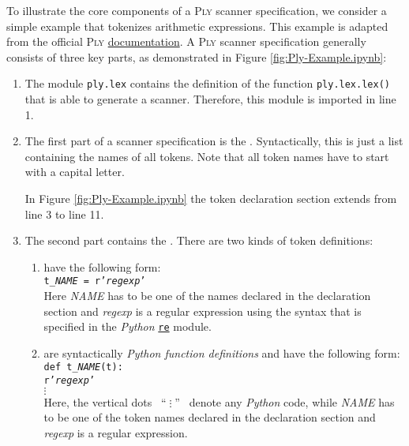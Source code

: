 To illustrate the core components of a \textsc{Ply} scanner specification, we consider a simple example that
tokenizes arithmetic expressions. This example is adapted from the official \textsc{Ply}
\href{https://ply.readthedocs.io/en/latest/ply.html#specification-of-tokens}{documentation}. A \textsc{Ply}
scanner specification generally consists of three key parts, as demonstrated in Figure
\ref{fig:Ply-Example.ipynb}: 
\begin{enumerate}
\item The module \texttt{ply.lex} contains the definition of the function \texttt{ply.lex.lex()}
      that is able to generate a scanner.
      Therefore, this module is imported in line 1.
\item The first part of a scanner specification is the .
      Syntactically, this is just a list containing the names of all tokens.  Note that all token names have to
      start with a capital 
      letter.

      In Figure \ref{fig:Ply-Example.ipynb} the token declaration section extends from line 3 to line 11.
\item The second part contains the .  There are two kinds of token definitions:
      \begin{enumerate}
      \item {}  have the following form:
            \\[0.2cm]
            \hspace*{1.3cm}
            \texttt{t\_\textsl{NAME} = r'\textsl{regexp}'}
            \\[0.2cm]
            Here \textsl{NAME} has to be one of the names declared in the declaration section and
            \textsl{regexp} is a regular expression using the syntax that is specified in the 
            \textsl{Python} \href{https://docs.python.org/3/library/re.html}{\texttt{re}} module.
      \item {}  are syntactically
            \textsl{Python function definitions} and have the following form:
            \\[0.2cm]
            \hspace*{1.3cm}
            \texttt{def t\_\textsl{NAME}(t):} \\
            \hspace*{2.05cm}
            \texttt{r'\textsl{regexp}'} \\
            \hspace*{2.8cm} $\vdots$ \\[0.2cm]
            Here, the vertical dots \ ``$\;\vdots\;$'' \ denote any \textsl{Python} code, while
            \textsl{NAME} has to be one of the token names declared in the declaration section and
            \textsl{regexp} is a regular expression.
            

\end{enumerate}
\end{enumerate}
